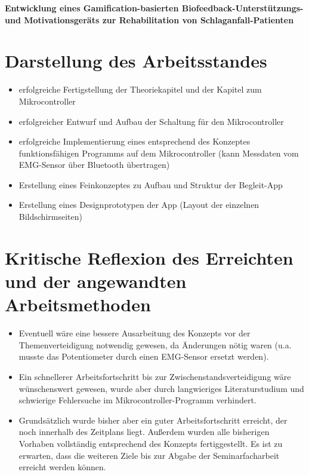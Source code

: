 \documentclass[a4paper, 11pt, landscape]{scrartcl}
\begin{document}
\centering \textbf{\Large{Entwicklung eines Gamification-basierten Biofeedback-Unterstützungs- und Motivationsgeräts zur Rehabilitation von Schlaganfall-Patienten}}
\\
\begin{multicols*}{2}
\section{Darstellung des Arbeitsstandes}
\begin{itemize}
\item erfolgreiche Fertigstellung der Theoriekapitel und der Kapitel zum Mikrocontroller
\item erfolgreicher Entwurf und Aufbau der Schaltung für den Mikrocontroller
\item erfolgreiche Implementierung eines entsprechend des Konzeptes funktionsfähigen Programms auf dem Mikrocontroller (kann Messdaten vom EMG-Sensor über Bluetooth übertragen)
\item Erstellung eines Feinkonzeptes zu Aufbau und Struktur der Begleit-App
\item Erstellung eines Designprototypen der App (Layout der einzelnen Bildschirmseiten)
\end{itemize}
\section{Kritische Reflexion des Erreichten und der angewandten Arbeitsmethoden}
\begin{itemize}
\item Eventuell wäre eine bessere Ausarbeitung des Konzepts vor der Themenverteidigung notwendig gewesen, da Änderungen nötig waren (u.a. musste das Potentiometer durch einen EMG-Sensor ersetzt werden).
\item Ein schnellerer Arbeitsfortschritt bis zur Zwischenstandsverteidigung wäre wünschenswert gewesen, wurde aber durch langwieriges Literaturstudium und schwierige Fehlersuche im Mikrocontroller-Programm verhindert.
\item Grundsätzlich wurde bisher aber ein guter Arbeitsfortschritt erreicht, der noch innerhalb des Zeitplans liegt. Außerdem wurden alle bisherigen Vorhaben vollständig entsprechend des Konzepts fertiggestellt. Es ist zu erwarten, dass die weiteren Ziele bis zur Abgabe der Seminarfacharbeit erreicht werden können.
\end{itemize}

\end{multicols*}
\end{document}
